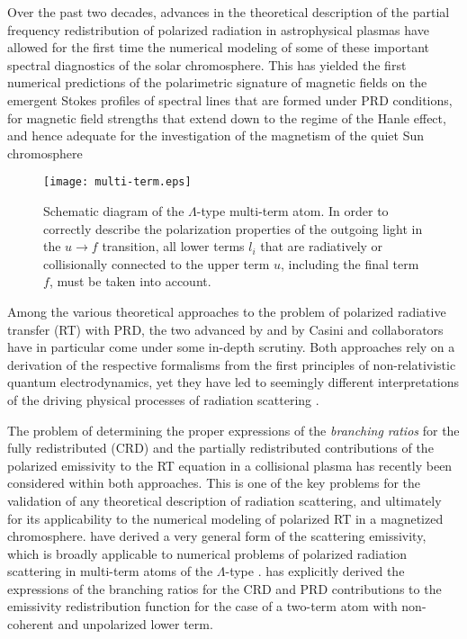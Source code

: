 \documentclass[preprint]{aastex}
\newcommand{\<}{{\kern-5pt}}
\begin{document}
Over the past two decades, advances in the theoretical description of 
the partial frequency redistribution of polarized radiation in
astrophysical plasmas \citep{La97,Bo97a,Bo97b,BS99,Ca14,Bo16,CM16} 
have allowed for the first time the numerical modeling of some of these 
important spectral diagnostics of the solar chromosphere. This has 
yielded the first numerical predictions of the polarimetric 
signature of magnetic fields on the emergent Stokes profiles of 
spectral lines that are formed under PRD conditions, for 
magnetic field strengths that extend down to 
the regime of the Hanle effect, and hence adequate for the investigation 
of the magnetism of the quiet Sun chromosphere \citep{TB11,So14,dPA16,Al16}

\begin{figure}[t!]
\centering
\texttt{[image: multi-term.eps]}
\caption{Schematic diagram of the $\Lambda$-type multi-term atom.
In order to correctly describe the polarization properties of the outgoing light
in the $u\to f$ transition, all lower terms $l_i$ that are radiatively
or collisionally connected to the upper term $u$, including the final 
term $f$, must be taken into account.
\label{fig:atom_model}}
\end{figure}

Among the various theoretical approaches to the problem of polarized radiative 
transfer (RT) with PRD, the two advanced by \cite{Bo97a,Bo97b,Bo16} and by Casini 
and collaborators \citep{Ca14,CM16} have in particular come under some 
in-depth scrutiny. Both
approaches rely on a derivation of the respective formalisms from the 
first principles of non-relativistic quantum electrodynamics, 
yet they have led to seemingly different interpretations of the driving
physical processes of radiation scattering 
\cite[see the discussions in][]{Ca14,Bo16,Bo17}. 

The problem of determining the proper expressions of the \emph{branching 
ratios} for the fully redistributed (CRD) and the partially 
redistributed contributions of the polarized emissivity to the 
RT equation in a collisional plasma has recently been 
considered within both approaches. This is one of the key
problems for the 
validation of any theoretical description of radiation scattering, and 
ultimately for its applicability to the numerical modeling of polarized 
RT in a magnetized chromosphere. \cite{Ca17} have derived 
a very general form of the scattering emissivity, 
which is broadly applicable to numerical problems of polarized radiation 
scattering in multi-term atoms of the $\Lambda$-type \cite[][see also
Figure~\ref{fig:atom_model}]{CM16}. 
\cite{Bo17} has explicitly derived the expressions of the branching ratios 
for the CRD and PRD contributions to the emissivity redistribution
function for the case of a two-term atom with non-coherent and 
unpolarized lower term.
\end{document}
